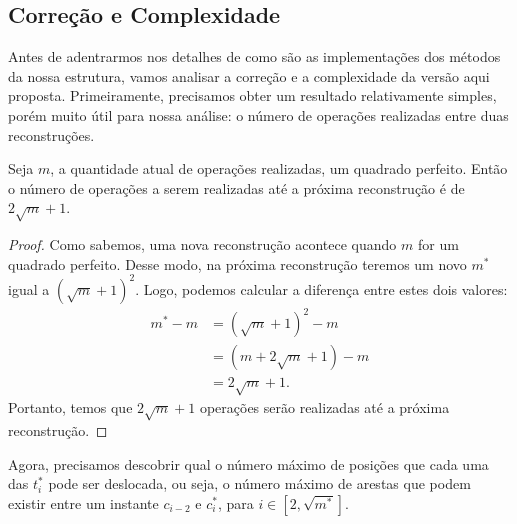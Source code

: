 \subsection{Correção e Complexidade}
\label{sec:rmsf-complexidade}

Antes de adentrarmos nos detalhes de como são as implementações dos métodos da nossa estrutura, vamos analisar a correção e a complexidade da versão aqui proposta. Primeiramente, precisamos obter um resultado relativamente simples, porém muito útil para nossa análise: o número de operações realizadas entre duas reconstruções.

\begin{lemma}
    \label{coro:amt-op}
    Seja $m$, a quantidade atual de operações realizadas, um quadrado perfeito. Então o número de operações a serem realizadas até a próxima reconstrução é de $2 \sqrt{m} + 1$.
\end{lemma}
\begin{proof}
    Como sabemos, uma nova reconstrução acontece quando $m$ for um quadrado perfeito. Desse modo, na próxima reconstrução teremos um novo $m^*$ igual a $(\sqrt{m} + 1)^2$. Logo, podemos calcular a diferença entre estes dois valores:
    \begin{align*}
        m^* - m & = (\sqrt{m} + 1)^2 - m    \\
                & = (m + 2\sqrt{m} + 1) - m \\
                & = 2\sqrt{m} + 1.
    \end{align*}
    Portanto, temos que $2\sqrt{m} + 1$ operações serão realizadas até a próxima reconstrução.
\end{proof}

Agora, precisamos descobrir qual o número máximo de posições que cada uma das $t_i^*$ pode ser deslocada, ou seja, o número máximo de arestas que podem existir entre um instante $c_{i-2}$ e $c_i^*$, para $i \in [2,\sqrt{m^*}]$.

